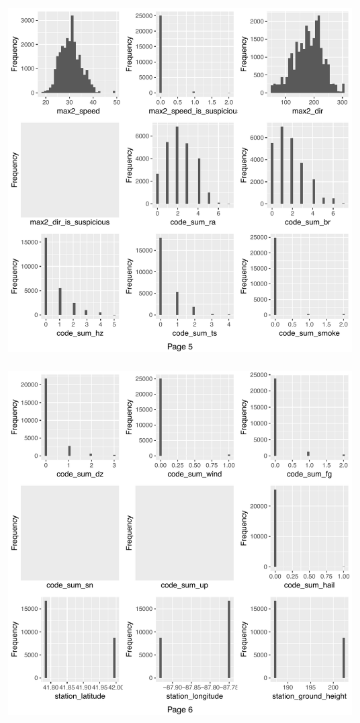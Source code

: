 \begin{figure}
	\ContinuedFloat 
	\begin{subfigure}[t]{0.49\textwidth}
		\includegraphics[width=\textwidth]{images/ml/plot_histogram5}
	\end{subfigure}
	\begin{subfigure}[t]{0.49\textwidth}
		\includegraphics[width=\textwidth]{images/ml/plot_histogram6}

\end{subfigure}
\end{figure}
